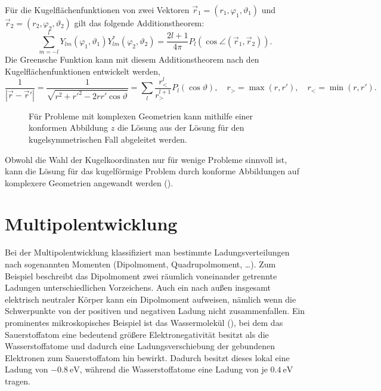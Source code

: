 Für die Kugelflächenfunktionen von zwei Vektoren $\vec {r}_{1}=\left(r_{1},\varphi _{1},\vartheta _{1}\right)$ und $\vec {r}_{2}=\left(r_{2},\varphi _{2},\vartheta _{2}\right)$ gilt das folgende Additionstheorem:
\begin{equation*}
	\sum _{m=-l}^{l}Y_{lm}\left(\varphi _{1},\vartheta _{1}\right)Y_{lm}^{*}\left(\varphi _{2},\vartheta _{2}\right)=\frac{2l+1}{4\pi }P_{l}\left(\cos \angle \left(\vec {r}_{1},\vec {r}_{2}\right)\right).
\end{equation*}
Die Greensche Funktion kann mit diesem Additionstheorem nach den Kugelflächenfunktionen entwickelt werden,
\begin{equation*}
	\frac{1}{\left| \vec {r}-\vec {r}'\right| }=\frac{1}{\sqrt{r^{2}+r'^{2}-2rr'\cos \vartheta }}=\sum _{l}\frac{r_{<}^{l}}{r_{>}^{l+1}}P_{l}\left(\cos \vartheta \right),\quad
	r_{>}=\max \left(r,r'\right) ,\quad
	r_{<}=\min \left(r,r'\right).
\end{equation*}


\begin{figure}[htb]
	\centering
	\tfigComplexProblemsConformalMap
	\caption{Für Probleme mit komplexen Geometrien kann mithilfe einer konformen Abbildung $z$ die Lösung aus der Lösung für den kugelsymmetrischen Fall abgeleitet werden. }
	\label{fig:complex_problems_conformal_map}
\end{figure}

Obwohl die Wahl der Kugelkoordinaten nur für wenige Probleme sinnvoll ist, kann die Lösung für das kugelförmige Problem durch konforme Abbildungen auf komplexere Geometrien angewandt werden ().

\section{Multipolentwicklung}

Bei der Multipolentwicklung klassifiziert man bestimmte Ladungsverteilungen nach sogenannten Momenten (Dipolmoment, Quadrupolmoment, {\ldots}). Zum Beispiel beschreibt das Dipolmoment zwei räumlich voneinander getrennte Ladungen unterschiedlichen Vorzeichens. Auch ein nach außen insgesamt elektrisch neutraler Körper kann ein Dipolmoment aufweisen, nämlich wenn die Schwerpunkte von der positiven und negativen Ladung nicht zusammenfallen. Ein prominentes mikroskopisches Beispiel ist das Wassermolekül (), bei dem das Sauerstoffatom eine bedeutend größere Elektronegativität besitzt als die Wasserstoffatome und dadurch eine Ladungsverschiebung der gebundenen Elektronen zum Sauerstoffatom hin bewirkt. Dadurch besitzt dieses lokal eine Ladung von $\SI{-0.8}{\eV}$, während die Wasserstoffatome eine Ladung von je $\SI{+0.4}{\eV}$ tragen.

